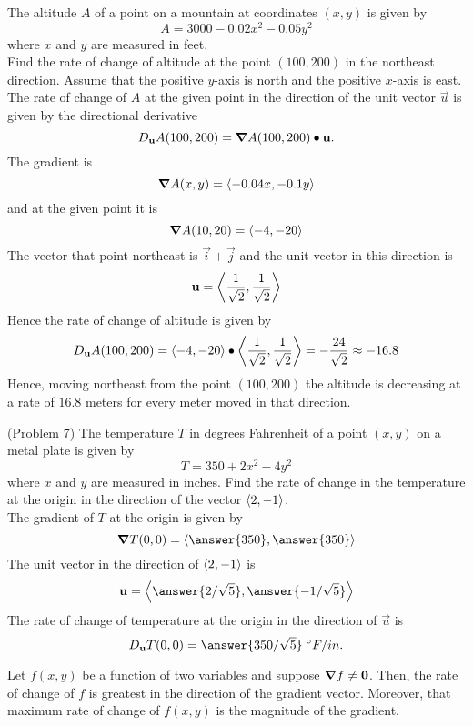 \documentclass[handout]{ximera}
\begin{document}
\begin{example}[Example 7]
The altitude $A$ of a point on a mountain at coordinates $(x, y)$ is given by
\[
A = 3000 - 0.02x^2 - 0.05y^2
\]
where $x$ and $y$ are measured in feet.\\
Find the rate of change of altitude at the point $(100, 200)$ in the northeast direction. 
Assume that the positive $y$-axis is north and the positive $x$-axis is east.\\
The rate of change of $A$ at the given point in the direction of the unit vector $\vec u$ is given by the directional derivative
\[
D_{\mathbf u} A(100, 200) = \boldsymbol\nabla A(100,200) \bullet \mathbf u.
\]
The gradient is
\[
\boldsymbol\nabla A(x,y) = \left\langle -0.04x, -0.1y\right\rangle
\]
and at the given point it is
\[
\boldsymbol\nabla A(10,20) = \left\langle -4, -20\right\rangle
\]
The vector that point northeast is $\vec i  + \vec j$ and the unit vector in this direction is
\[
\mathbf u = \left\langle \frac{1}{\sqrt 2}, \frac{1}{\sqrt 2}\right\rangle
\]
Hence the rate of change of altitude is given by
\[
D_{\mathbf u} A(100, 200) = \left\langle -4, -20\right\rangle \bullet \left\langle \frac{1}{\sqrt 2}, \frac{1}{\sqrt 2}\right\rangle = -\frac{24}{\sqrt 2} \approx -16.8
\]
Hence, moving northeast from the point $(100, 200)$ the altitude is decreasing at a rate of 
$16.8$ meters for every meter moved in that direction.
\end{example}

\begin{problem}(Problem 7)
The temperature $T$ in degrees Fahrenheit of a point $(x,y)$ on a metal plate is given by 
\[
T = 350 + 2x^2 - 4y^2
\]
where $x$ and $y$ are measured in inches.  Find the rate of change in the temperature at the origin in the direction of the vector $\left\langle 2,-1\right\rangle$.\\
The gradient of $T$ at the origin is given by
\[
\grad T(0,0) = \vector{\answer{350}, \answer{350}}
\]
The unit vector in the direction of $\left\langle 2, -1\right\rangle$ is
\[
\vec u = \vector{\answer{2/\sqrt 5}, \answer{-1/\sqrt 5}}
\]
The rate of change of temperature at the origin in the direction of $\vec u$ is
\[
D_{\vec u} T(0,0) = \answer{350/ \sqrt 5} \; ^\circ F / in.
\]
\end{problem}



\begin{proposition}
Let $f(x,y)$ be a function of two variables and suppose $\boldsymbol\nabla f \neq \mathbf 0$. 
Then, the rate of change of $f$ is greatest in the direction of the gradient vector.
Moreover, that maximum rate of change of $f(x,y)$ is the magnitude of the gradient.

\end{proposition}
\end{document}
